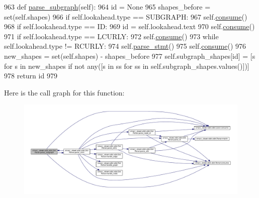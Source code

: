 \begin{DoxyCode}
963     \textcolor{keyword}{def }\hyperlink{classsmacc__viewer_1_1xdot_1_1xdot_1_1DotParser_aa0071f6f1c4280c56a30bb7613e2746d}{parse\_subgraph}(self):
964         id = \textcolor{keywordtype}{None}
965         shapes\_before = set(self.shapes)
966         \textcolor{keywordflow}{if} self.lookahead.type == SUBGRAPH:
967             self.\hyperlink{classsmacc__viewer_1_1xdot_1_1xdot_1_1Parser_ab70715898a2ec0b51c6b333b73c78c37}{consume}()
968             \textcolor{keywordflow}{if} self.lookahead.type == ID:
969                 id = self.lookahead.text
970                 self.\hyperlink{classsmacc__viewer_1_1xdot_1_1xdot_1_1Parser_ab70715898a2ec0b51c6b333b73c78c37}{consume}()
971         \textcolor{keywordflow}{if} self.lookahead.type == LCURLY:
972             self.\hyperlink{classsmacc__viewer_1_1xdot_1_1xdot_1_1Parser_ab70715898a2ec0b51c6b333b73c78c37}{consume}()
973             \textcolor{keywordflow}{while} self.lookahead.type != RCURLY:
974                 self.\hyperlink{classsmacc__viewer_1_1xdot_1_1xdot_1_1DotParser_ab0abf8209a36d81e162b0dc2a0b94d54}{parse\_stmt}()
975             self.\hyperlink{classsmacc__viewer_1_1xdot_1_1xdot_1_1Parser_ab70715898a2ec0b51c6b333b73c78c37}{consume}()
976         new\_shapes = set(self.shapes) - shapes\_before
977         self.subgraph\_shapes[id] = [s \textcolor{keywordflow}{for} s \textcolor{keywordflow}{in} new\_shapes \textcolor{keywordflow}{if} \textcolor{keywordflow}{not} any([s \textcolor{keywordflow}{in} ss \textcolor{keywordflow}{for} ss \textcolor{keywordflow}{in} 
      self.subgraph\_shapes.values()])]
978         \textcolor{keywordflow}{return} id
979 
\end{DoxyCode}


Here is the call graph for this function\+:
\nopagebreak
\begin{figure}[H]
\begin{center}
\leavevmode
\includegraphics[width=350pt]{classsmacc__viewer_1_1xdot_1_1xdot_1_1DotParser_aa0071f6f1c4280c56a30bb7613e2746d_cgraph}
\end{center}
\end{figure}




